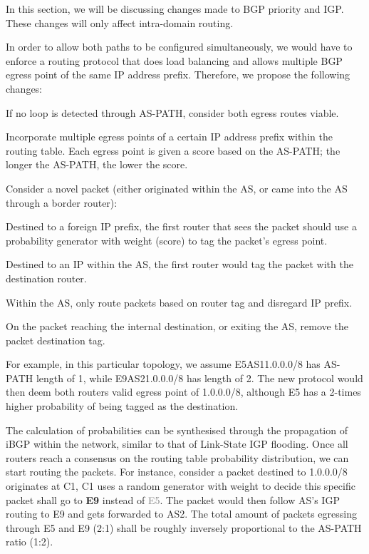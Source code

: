 \documentclass[12pt]{article}
\newcommand{\SubItem}[1]{
    {\setlength\itemindent{15pt} \item[-] #1}
}
\begin{document}
In this section, we will be discussing changes made to BGP priority and IGP. These changes will only affect intra-domain routing.

In order to allow both paths to be configured simultaneously, we would have to enforce a routing protocol that does load balancing and allows multiple BGP egress point of the same IP address prefix. Therefore, we propose the following changes:

\begin{itemize}
    \item If no loop is detected through AS-PATH, consider both egress routes viable.
    \item Incorporate multiple egress points of a certain IP address prefix within the routing table. Each egress point is given a score based on the AS-PATH; the longer the AS-PATH, the lower the score.
    \item Consider a novel packet (either originated within the AS, or came into the AS through a border router):
    \SubItem{Destined to a foreign IP prefix, the first router that sees the packet should use a probability generator with weight (score) to tag the packet's egress point.}
    \SubItem{Destined to an IP within the AS, the first router would tag the packet with the destination router.}
    \item Within the AS, only route packets based on router tag and disregard IP prefix.
    \item On the packet reaching the internal destination, or exiting the AS, remove the packet destination tag.
\end{itemize}

For example, in this particular topology, we assume E5\textrightarrow{}AS1\textrightarrow{}1.0.0.0/8 has AS-PATH length of 1, while E9\textrightarrow{}AS2\textrightarrow{}1.0.0.0/8 has length of 2. The new protocol would then deem both routers valid egress point of 1.0.0.0/8, although E5 has a 2-times higher probability of being tagged as the destination.

The calculation of probabilities can be synthesised through the propagation of iBGP within the network, similar to that of Link-State IGP flooding. Once all routers reach a consensus on the routing table probability distribution, we can start routing the packets. For instance, consider a packet destined to 1.0.0.0/8 originates at C1, C1 uses a random generator with weight to decide this specific packet shall go to \textbf{E9} instead of \textcolor{grey}{E5}. The packet would then follow AS's IGP routing to E9 and gets forwarded to AS2. The total amount of packets egressing through E5 and E9 (2:1) shall be roughly inversely proportional to the AS-PATH ratio (1:2).
\end{document}
